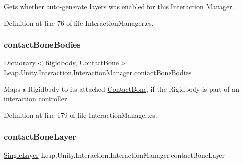 Gets whether auto-\/generate layers was enabled for this \mbox{\hyperlink{namespace_leap_1_1_unity_1_1_interaction}{Interaction}} Manager. 



Definition at line 76 of file Interaction\+Manager.\+cs.

\mbox{\label{class_leap_1_1_unity_1_1_interaction_1_1_interaction_manager_a025e8a1a9e433fd86245a0e836deba86}} 
\subsubsection{\texorpdfstring{contactBoneBodies}{contactBoneBodies}}
{\footnotesize\ttfamily Dictionary$<$Rigidbody, \mbox{\hyperlink{class_leap_1_1_unity_1_1_interaction_1_1_contact_bone}{Contact\+Bone}}$>$ Leap.\+Unity.\+Interaction.\+Interaction\+Manager.\+contact\+Bone\+Bodies\hspace{0.3cm}{\ttfamily [get]}}



Maps a Rigidbody to its attached \mbox{\hyperlink{class_leap_1_1_unity_1_1_interaction_1_1_contact_bone}{Contact\+Bone}}, if the Rigidbody is part of an interaction controller. 



Definition at line 179 of file Interaction\+Manager.\+cs.

\mbox{\label{class_leap_1_1_unity_1_1_interaction_1_1_interaction_manager_a8d638a6bce8faff14a6ceedf0d7cd9eb}} 
\subsubsection{\texorpdfstring{contactBoneLayer}{contactBoneLayer}}
{\footnotesize\ttfamily \mbox{\hyperlink{struct_leap_1_1_unity_1_1_single_layer}{Single\+Layer}} Leap.\+Unity.\+Interaction.\+Interaction\+Manager.\+contact\+Bone\+Layer\hspace{0.3cm}{\ttfamily [get]}}



